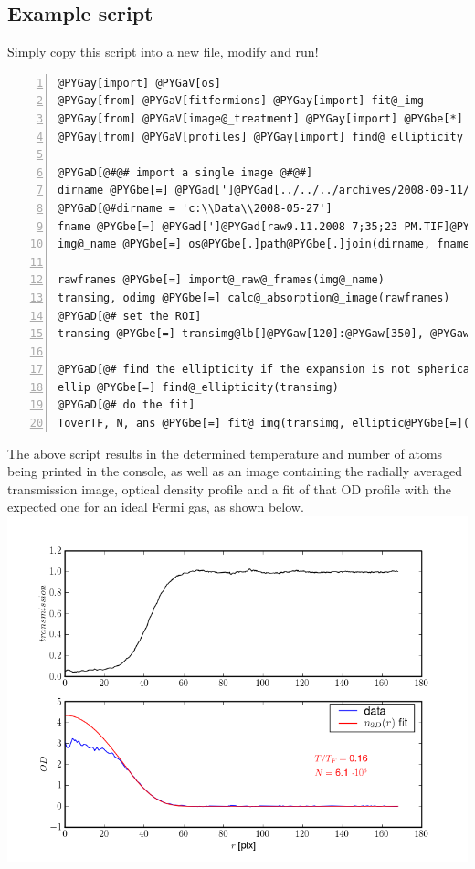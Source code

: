 \documentclass[letterpaper,10pt,english]{manual}
\begin{document}
\subsection{Example script}

Simply copy this script into a new file, modify and run!

\begin{Verbatim}[commandchars=@\[\],numbers=left,firstnumber=1,stepnumber=1]
@PYGay[import] @PYGaV[os]
@PYGay[from] @PYGaV[fitfermions] @PYGay[import] fit@_img
@PYGay[from] @PYGaV[image@_treatment] @PYGay[import] @PYGbe[*]
@PYGay[from] @PYGaV[profiles] @PYGay[import] find@_ellipticity

@PYGaD[@#@# import a single image @#@#]
dirname @PYGbe[=] @PYGad[']@PYGad[../../../archives/2008-09-11/]@PYGad[']
@PYGaD[@#dirname = 'c:\\Data\\2008-05-27']
fname @PYGbe[=] @PYGad[']@PYGad[raw9.11.2008 7;35;23 PM.TIF]@PYGad[']
img@_name @PYGbe[=] os@PYGbe[.]path@PYGbe[.]join(dirname, fname)

rawframes @PYGbe[=] import@_raw@_frames(img@_name)
transimg, odimg @PYGbe[=] calc@_absorption@_image(rawframes)
@PYGaD[@# set the ROI]
transimg @PYGbe[=] transimg@lb[]@PYGaw[120]:@PYGaw[350], @PYGaw[50]:@PYGaw[275]@rb[]

@PYGaD[@# find the ellipticity if the expansion is not spherically symmetric]
ellip @PYGbe[=] find@_ellipticity(transimg)
@PYGaD[@# do the fit]
ToverTF, N, ans @PYGbe[=] fit@_img(transimg, elliptic@PYGbe[=](ellip, @PYGaw[0]))
\end{Verbatim}

The above script results in the determined temperature and number of atoms being printed in the console, as well as an image containing the radially averaged transmission image, optical density profile and a fit of that OD profile with the expected one for an ideal Fermi gas, as shown below.
\includegraphics[width=400pt]{example_fit.png}
\end{document}
